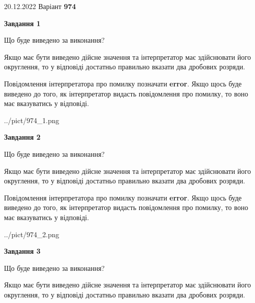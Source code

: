 \documentclass[12pt, ukrainian]{article}
\begin{document}
{20.12.2022 Варіант \No \textbf { 974 }\par}
{
\begin {Large}

{\begin {center}\textbf{Завдання 1}\end {center}}\par
Що буде виведено за виконання? \par

Якщо має бути виведено дійсне значення та інтерпретатор має здійснювати його округлення, 
то у відповіді достатньо правильно вказати два дробових розряди.

Повідомлення інтерпретатора про помилку позначати \textbf{error}.
Якщо щось буде виведено до того, як інтерпретатор видасть повідомлення про помилку, 
то воно має вказуватись у відповіді. \par

\begin{center}
	{../pict/974_1.png}
\end{center}
\newpage

{\begin {center}\textbf{Завдання 2}\end {center}}\par
Що буде виведено за виконання? \par

Якщо має бути виведено дійсне значення та інтерпретатор має здійснювати його округлення, 
то у відповіді достатньо правильно вказати два дробових розряди.

Повідомлення інтерпретатора про помилку позначати \textbf{error}.
Якщо щось буде виведено до того, як інтерпретатор видасть повідомлення про помилку, 
то воно має вказуватись у відповіді. \par

\begin{center}
	{../pict/974_2.png}
\end{center}
\newpage

{\begin {center}\textbf{Завдання 3}\end {center}}\par
Що буде виведено за виконання? \par

Якщо має бути виведено дійсне значення та інтерпретатор має здійснювати його округлення, 
то у відповіді достатньо правильно вказати два дробових розряди.


\end{Large}}
\end{document}
